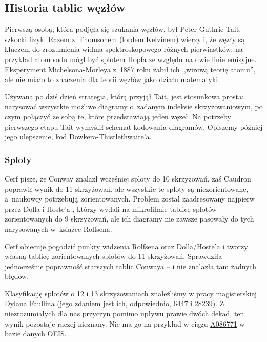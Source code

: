 
\subsection{Historia tablic węzłów}
Pierwszą osobą, która podjęła się szukania węzłów, był Peter Guthrie Tait, szkocki fizyk.
%
Razem z~Thomsonem (lordem Kelvinem) wierzyli, że węzły są kluczem do zrozumienia widma spektroskopowego różnych pierwiastków: na przykład atom sodu mógł być splotem Hopfa ze względu na dwie linie emisyjne.
%
Eksperyment Michelsona-Morleya z~1887 roku zabił ich ,,wirową teorię atomu'', ale nie miało to znaczenia dla teorii węzłów jako działu matematyki.

Używana po dziś dzień strategia, którą przyjął Tait, jest stosunkowa prosta: narysować wszystkie możliwe diagramy o~zadanym indeksie skrzyżowaniowym, po czym połączyć ze sobą te, które przedstawiają jeden węzeł.
Na potrzeby pierwszego etapu Tait wymyślił schemat kodowania diagramów.
Opiszemy później jego ulepszenie, kod Dowkera-Thistlethwaite'a.













\subsubsection{Sploty}
Cerf \cite{cerf98} pisze, że Conway \cite{conway70} znalazł wcześniej sploty do 10 skrzyżowań, zaś Caudron \cite{caudron82} poprawił wynik do 11 skrzyżowań, ale wszystkie te sploty są niezorientowane, a~naukowcy potrzebują zorientowanych.
%
%
%
Problem został zaadresowany najpierw przez Dolla i Hoste'a \cite{doll91}, którzy wydali na mikrofilmie tablicę splotów zorientowanych do 9 skrzyżowań, ale ich diagramy nie zawsze pasowały do tych narysowanych w~książce Rolfsena.
%
%

Cerf obiecuje pogodzić punkty widzenia Rolfsena oraz Dolla/Hoste'a i tworzy własną tablicę zorientowanych splotów do 11 skrzyżowań.
Sprawdziła jednocześnie poprawność starszych tablic Conwaya -- i nie znalazła tam żadnych błędów.

Klasyfikację splotów o 12 i 13 skrzyżowaniach znaleźliśmy w pracy magisterskiej Dylana Faullina (jego zdaniem jest ich, odpowiednio, 6447 i 28239).
%
Z niezrozumiałych dla nas przyczyn pomimo upływu prawie dwóch dekad, ten wynik pozostaje raczej nieznany.
Nie ma go na przykład w ciągu \href{https://oeis.org/A086771}{A086771} w bazie danych OEIS.